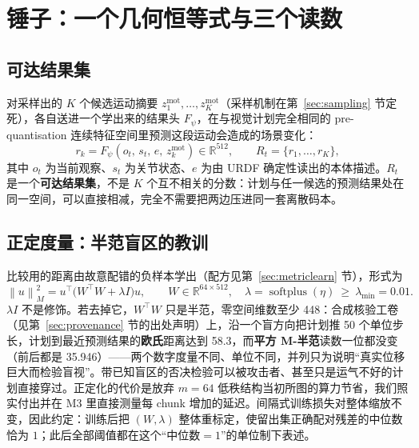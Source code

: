 \documentclass[11pt,a4paper]{ctexart}
\newcommand{\zmot}{z^{\mathrm{mot}}}
\newcommand{\Rt}{R_t}
\newcommand{\norM}[1]{\left\lVert #1 \right\rVert_M}
\begin{document}
\section{锤子：一个几何恒等式与三个读数}\label{sec:hammer}

\subsection{可达结果集}

对采样出的 $K$ 个候选运动摘要 $\zmot_1,\dots,\zmot_K$（采样机制在第~\ref{sec:sampling} 节定死），各自送进一个学出来的结果头 $F_\psi$，在与视觉计划完全相同的 pre-quantisation 连续特征空间里预测这段运动会造成的场景变化：
\begin{equation}
  r_k = F_\psi(o_t,\, s_t,\, e,\, \zmot_k)\in\mathbb{R}^{512},\qquad
  \Rt=\{r_1,\dots,r_K\},
  \label{eq:reachset}
\end{equation}
其中 $o_t$ 为当前观察、$s_t$ 为关节状态、$e$ 为由 URDF 确定性读出的本体描述。$\Rt$ 是一个\textbf{可达结果集}，不是 $K$ 个互不相关的分数：计划与任一候选的预测结果处在同一空间，可以直接相减，完全不需要把两边压进同一套离散码本。

\subsection{正定度量：半范盲区的教训}\label{sec:metric}

比较用的距离由故意配错的负样本学出（配方见第~\ref{sec:metriclearn} 节），形式为
\begin{equation}
  \norM{u}^2 = u^\top\!\bigl(W^\top W+\lambda I\bigr)u,\qquad
  W\in\mathbb{R}^{64\times512},\quad
  \lambda=\operatorname{softplus}(\eta)\ \ge\ \lambda_{\min}=0.01 .
  \label{eq:metric}
\end{equation}
$\lambda I$ 不是修饰。若去掉它，$W^\top W$ 只是半范，零空间维数至少 448：合成核验工卷（见第~\ref{sec:provenance} 节的出处声明）上，沿一个盲方向把计划推 50 个单位步长，计划到最近预测结果的\textbf{欧氏}距离达到 58.3，而\textbf{平方 M-半范}读数一位都没变（前后都是 35.946）——两个数字度量不同、单位不同，并列只为说明``真实位移巨大而检验盲视''。带已知盲区的否决检验可以被攻击者、甚至只是运气不好的计划直接穿过。正定化的代价是放弃 $m=64$ 低秩结构当初所图的算力节省，我们照实付出并在 M3 里直接测量每 chunk 增加的延迟。间隔式训练损失对整体缩放不变，因此约定：训练后把 $(W,\lambda)$ 整体重标定，使留出集正确配对残差的中位数恰为 $1$；此后全部阈值都在这个``中位数$=1$''的单位制下表述。
\end{document}
